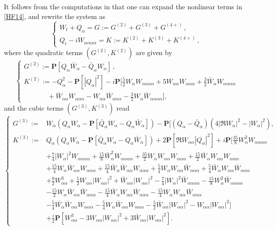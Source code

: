 \documentclass[12pt]{amsart}
\theoremstyle{remark}
\theoremstyle{definition}
\numberwithin{equation}{section}
\newcommand{\al}{\alpha}
\newcommand{\f}{\frac}
\newcommand{\nP}{{\mathbf P}}
\begin{document}
It follows from the computations in \cite{MR4846707} that one can expand the nonlinear terms in \eqref{HF14}, and rewrite the system as
\begin{equation}\label{NF1}
\begin{cases}		W_t+Q_{\al}=G:=G^{(2)}+G^{(3)}+G^{(4+)}\,,\\
Q_t-iW_{\al\al\al\al}=K:=K^{(2)}+K^{(3)}+K^{(4+)}\,,
		\end{cases}
	\end{equation}
where the quadratic terms $\left(G^{(2)},K^{(2)}\right)$ are given by
	\begin{equation}\label{NF2}
		\begin{cases}
			G^{(2)}:=\nP[Q_{\al}\bar{W}_{\al}-\bar{Q}_{\al}W_{\al}]\,,\\
			K^{(2)}:=-Q^2_{\al}-\nP[|Q_{\al}|^2]-i\nP[\f52W_{\al}W_{\al\al\al\al}+5W_{\al\al}W_{\al\al\al}+\f32\bar{W}_{\al}W_{\al\al\al\al}\\
			\qquad\quad \ \ +\bar{W}_{\al\al}W_{\al\al\al}-W_{\al\al}\bar{W}_{\al\al\al}-\f32W_{\al}\bar{W}_{\al\al\al\al}],
		\end{cases}
	\end{equation}
and the cubic terms $\left(G^{(3)},K^{(3)}\right)$ read
	\begin{equation}\label{NF3}
		\begin{cases}
			G^{(3)}:=&W_{\al}(Q_{\al}W_{\al}-\nP[\bar{Q}_{\al}W_{\al}-Q_{\al}\bar{W}_{\al}])-\nP[(Q_{\al}-\bar{Q}_{\al})(4|\mathfrak{R}W_{\al}|^2-|W_{\al}|^2),
			\\
			K^{(3)}:=&Q_{\al}(Q_{\al}W_{\al}-\nP[\bar{Q}_{\al}W_{\al}-Q_{\al}\bar{W}_{\al}])+2\nP[\mathfrak{R}W_{\al\al}|Q_{\al}|^2]
			+i\nP\Big[\f{35}{8}W^2_{\al}W_{\al\al\al\al}\\
			&+\f74|W_{\al}|^2W_{\al\al\al\al}+\f{15}{8}\bar{W}^2_{\al}W_{\al\al\al\al}+\f{35}{2}W_{\al}W_{\al\al}W_{\al\al\al}
			+\f{15}{2}\bar{W}_{\al}W_{\al\al}W_{\al\al\al}\\
			&+\f{15}{4}W_{\al}\bar{W}_{\al\al}W_{\al\al\al}+\f{15}{4}\bar{W}_{\al}\bar{W}_{\al\al}W_{\al\al\al}
			+\f54W_{\al}W_{\al\al}\bar{W}_{\al\al\al}+\f54\bar{W}_{\al}W_{\al\al}\bar{W}_{\al\al\al}\\
			&+\f92W^3_{\al\al}+\f52W_{\al\al}|W_{\al\al}|^2+\bar{W}_{\al\al}|W_{\al\al}|^2
			-\f74|W_{\al}|^2\bar{W}_{\al\al\al\al}
			-\f{15}{8}W^2_{\al}\bar{W}_{\al\al\al\al}\\
			&-\f{15}{2}W_{\al}\bar{W}_{\al\al}\bar{W}_{\al\al\al}
			-\f{15}{4}\bar{W}_{\al}W_{\al\al}\bar{W}_{\al\al\al}-\f{15}{4}W_{\al}W_{\al\al}\bar{W}_{\al\al\al}\\
			&-\f54\bar{W_{\al}}\bar{W}_{\al\al}W_{\al\al\al}-\f54W_{\al}\bar{W}_{\al\al}W_{\al\al\al}
			-\f52\bar{W}_{\al\al}|W_{\al\al}|^2-W_{\al\al}|W_{\al\al}|^2\Big]\\
			&+\f{i}{2}\nP[W^3_{\al\al}-3W_{\al\al}|W_{\al\al}|^2+3\bar{W}_{\al\al}|W_{\al\al}|^2].
		\end{cases}
	\end{equation}
\end{document}
